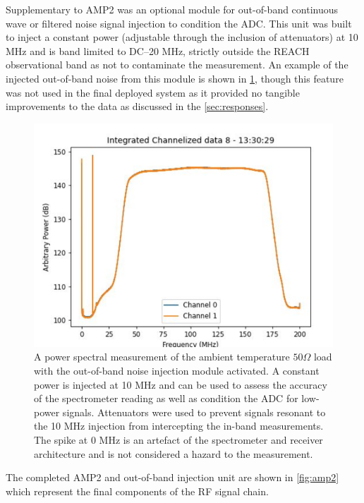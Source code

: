 Supplementary to AMP2 was an optional module for out-of-band continuous wave or filtered noise signal injection to condition the ADC. This unit was built to inject a constant power (adjustable through the inclusion of attenuators) at 10 MHz and is band limited to DC--20 MHz, strictly outside the REACH observational band as not to contaminate the measurement. An example of the injected out-of-band noise from this module is shown in \cref{fig:oob_cond}, though this feature was not used in the final deployed system as it provided no tangible improvements to the data as discussed in the \cref{sec:responses}.
\begin{figure}
    \centering
    \includegraphics[scale=0.5]{oob_cond}
    \caption{A power spectral measurement of the ambient temperature $50 \Omega$ load with the out-of-band noise injection module activated. A constant power is injected at 10 MHz and can be used to assess the accuracy of the spectrometer reading as well as condition the ADC for low-power signals. Attenuators were used to prevent signals resonant to the 10 MHz injection from intercepting the in-band measurements. The spike at 0 MHz is an artefact of the spectrometer and receiver architecture and is not considered a hazard to the measurement.}
    \label{fig:oob_cond}
\end{figure}
The completed AMP2 and out-of-band injection unit are shown in \cref{fig:amp2} which represent the final components of the RF signal chain.
